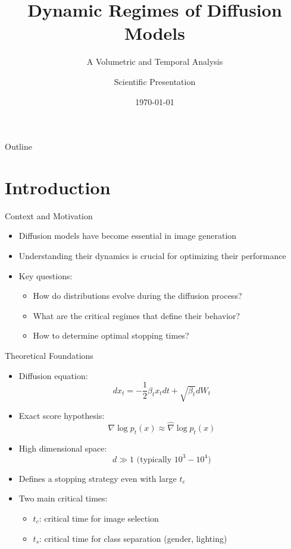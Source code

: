 \documentclass[aspectratio=169]{beamer}
\title{Dynamic Regimes of Diffusion Models}
\subtitle{A Volumetric and Temporal Analysis}
\author{Scientific Presentation}
\institute{Research Laboratory}
\date{\today}
\begin{document}
\begin{frame}
    \titlepage
\end{frame}

\begin{frame}{Outline}
    \tableofcontents
\end{frame}

\section{Introduction}

\begin{frame}{Context and Motivation}
    \begin{itemize}
        \item Diffusion models have become essential in image generation
        \item Understanding their dynamics is crucial for optimizing their performance
        \item Key questions:
        \begin{itemize}
            \item How do distributions evolve during the diffusion process?
            \item What are the critical regimes that define their behavior?
            \item How to determine optimal stopping times?
        \end{itemize}
    \end{itemize}
\end{frame}

\begin{frame}{Theoretical Foundations}
    \begin{itemize}
        \item Diffusion equation:
        \begin{equation}
            dx_t = -\frac{1}{2}\beta_t x_t dt + \sqrt{\beta_t} dW_t
        \end{equation}
        
        \item Exact score hypothesis:
        \begin{equation}
            \nabla \log p_t(x) \approx \hat{\nabla} \log p_t(x)
        \end{equation}
        
        \item High dimensional space:
        \begin{equation}
            d \gg 1 \text{ (typically } 10^3-10^4\text{)}
        \end{equation}
        
        \item Defines a stopping strategy even with large $t_c$
        \item Two main critical times:
        \begin{itemize}
            \item $t_c$: critical time for image selection
            \item $t_s$: critical time for class separation (gender, lighting)
        \end{itemize}
    \end{itemize}
\end{frame}
\end{document}
